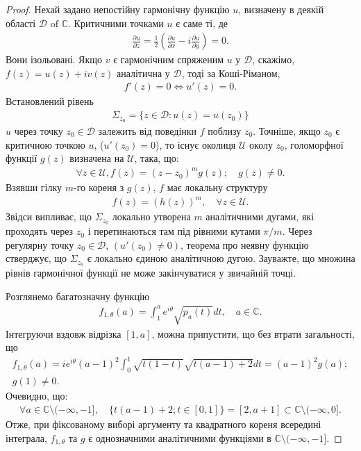 \documentclass[]{article}
\begin{document}
\begin{proof}
Нехай задано непостійну гармонічну функцію $ u $, визначену в деякій області $ \mathcal{D} \text{ of } \mathbb{C} $. Критичними точками $ u $ є саме ті, де
\begin{align*}
    \frac{\partial u}{\partial z} = \frac{1}{2} \left( \frac{\partial u}{\partial x} - i \frac{\partial u}{\partial y} \right) = 0.
\end{align*}
Вони ізольовані. Якщо $ v $ є гармонічним спряженим $ u $ у $ \mathcal{D} $, скажімо, $ f (z) = u (z) + iv (z) $ аналітична у $ \mathcal{D} $, тоді за Коші-Ріманом,
\begin{align*}
    f' (z) = 0 \iff u' (z) = 0.
\end{align*}
Встановлений рівень
\begin{align*}
    \Sigma_{z_0} = \{z \in \mathcal{D} : u (z) = u (z_0)\}
\end{align*}
$ u $ через точку $ z_0 \in \mathcal{D} $ залежить від поведінки $ f $ поблизу $ z_0 $. Точніше, якщо $ z_0 $ є критичною точкою $ u $, ($ u'(z_0) = 0 $), то існує околиця $ \mathcal{U} $ околу $ z_0 $, голоморфної функції $ g(z) $ визначена на $ \mathcal{U} $, така, що:
\begin{align*}
    \forall z \in \mathcal{U}, f(z) = (z - z_0)^m g(z); \quad g(z) \neq 0.
\end{align*}
Взявши гілку $ m $-го кореня з $ g(z) $, $ f $ має локальну структуру
\begin{align*}
    f(z) = (h(z))^m, \quad \forall z \in \mathcal{U}.
\end{align*}
Звідси випливає, що $ \Sigma_{z_0} $ локально утворена $ m $ аналітичними дугами, які проходять через $ z_0 $ і перетинаються там під рівними кутами $ \pi/m $. Через регулярну точку $ z_0 \in \mathcal{D} $, $ (u'(z_0) \neq 0) $, теорема про неявну функцію стверджує, що $ \Sigma_{z_0} $ є локально єдиною аналітичною дугою. Зауважте, що множина рівнів гармонічної функції не може закінчуватися у звичайній точці.

Розглянемо багатозначну функцію
\begin{align*}
    f_{1,\theta}(a) = \int_1^a e^{i\theta} \sqrt{p_a(t)} dt, \quad a \in \mathbb{C}.
\end{align*}
Інтегруючи вздовж відрізка $ [1,a] $, можна припустити, що без втрати загальності, що
\begin{multline} \label{eq:multivalued_function_step_1}
    f_{1,\theta}(a) = i e^{i\theta} (a - 1)^2 \int_0^1 \sqrt{t(1-t)} \sqrt{t(a-1) + 2} dt = (a - 1)^2 g(a);\\
    g(1) \neq 0.
\end{multline}
Очевидно, що:
\begin{align*}
    \forall a \in \mathbb{C} \setminus (-\infty, -1], \quad \{t(a - 1) + 2; t \in [0,1]\} = [2, a + 1] \subset \mathbb{C} \setminus (-\infty, 0].
\end{align*}
Отже, при фіксованому виборі аргументу та квадратного кореня всередині інтеграла, $f_{1,\theta}$ та $g$ є однозначними аналітичними функціями в $ \mathbb{C} \setminus (-\infty, -1] $.


\end{proof}
\end{document}
